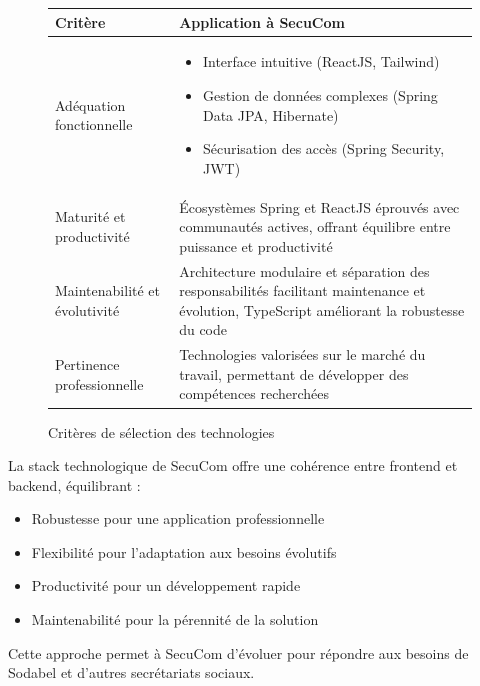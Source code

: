 \begin{figure}[h]
\centering
\begin{tabular}{|l|p{10cm}|}
\hline
\textbf{Critère} & \textbf{Application à SecuCom} \\
\hline
Adéquation fonctionnelle & 
\begin{itemize}[leftmargin=*,label=\textcolor{darkgray}{$\bullet$},itemsep=0.3em]
  \item Interface intuitive (ReactJS, Tailwind)
  \item Gestion de données complexes (Spring Data JPA, Hibernate)
  \item Sécurisation des accès (Spring Security, JWT)
\end{itemize} \\
\hline
Maturité et productivité & 
Écosystèmes Spring et ReactJS éprouvés avec communautés actives, offrant équilibre entre puissance et productivité \\
\hline
Maintenabilité et évolutivité & 
Architecture modulaire et séparation des responsabilités facilitant maintenance et évolution, TypeScript améliorant la robustesse du code \\
\hline
Pertinence professionnelle & 
Technologies valorisées sur le marché du travail, permettant de développer des compétences recherchées \\
\hline
\end{tabular}
\caption{Critères de sélection des technologies}
\end{figure}

\vspace{1cm}

\begin{tcolorbox}[
  title={\textbf{Cohérence technologique}},
  colback=blue!5!white,
  colframe=primarycolor,
  fonttitle=\bfseries,
  boxrule=0.5mm,
  arc=2mm,
  left=6mm,
  right=6mm,
  top=6mm,
  bottom=6mm
]
\noindent La stack technologique de SecuCom offre une cohérence entre frontend et backend, équilibrant :
\begin{itemize}[leftmargin=*,label=\textcolor{darkgray}{$\bullet$},itemsep=0.3em]
  \item Robustesse pour une application professionnelle
  \item Flexibilité pour l'adaptation aux besoins évolutifs
  \item Productivité pour un développement rapide
  \item Maintenabilité pour la pérennité de la solution
\end{itemize}

\noindent Cette approche permet à SecuCom d'évoluer pour répondre aux besoins de Sodabel et d'autres secrétariats sociaux.
\end{tcolorbox}
